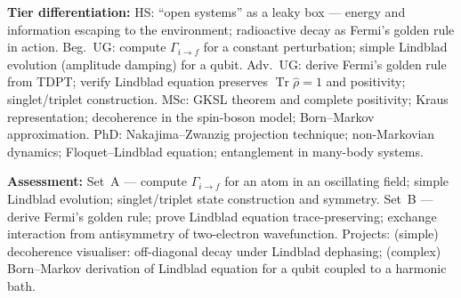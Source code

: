 \documentclass[11pt,a4paper]{article}
\begin{document}
\begin{tcolorbox}[modulebox, title={Module~I.3 --- Lecture L10: Time-Dependent PT, Open Systems, and Many-Body Preview}]
\medskip\textbf{Tier differentiation:}
HS: ``open systems'' as a leaky box --- energy and information escaping to the environment;
radioactive decay as Fermi's golden rule in action.
Beg.\ UG: compute $\Gamma_{i\to f}$ for a constant perturbation;
simple Lindblad evolution (amplitude damping) for a qubit.
Adv.\ UG: derive Fermi's golden rule from TDPT; verify Lindblad equation
preserves $\operatorname{Tr}\hat{\rho}=1$ and positivity; singlet/triplet construction.
MSc: GKSL theorem and complete positivity; Kraus representation;
decoherence in the spin-boson model; Born--Markov approximation.
PhD: Nakajima--Zwanzig projection technique; non-Markovian dynamics;
Floquet--Lindblad equation; entanglement in many-body systems.

\medskip\textbf{Assessment:}
Set~A --- compute $\Gamma_{i\to f}$ for an atom in an oscillating field;
simple Lindblad evolution; singlet/triplet state construction and symmetry.
Set~B --- derive Fermi's golden rule; prove Lindblad equation trace-preserving;
exchange interaction from antisymmetry of two-electron wavefunction.
Projects: (simple) decoherence visualiser: off-diagonal decay under Lindblad dephasing;
(complex) Born--Markov derivation of Lindblad equation for a qubit coupled to a harmonic bath.
\end{tcolorbox}
\end{document}
